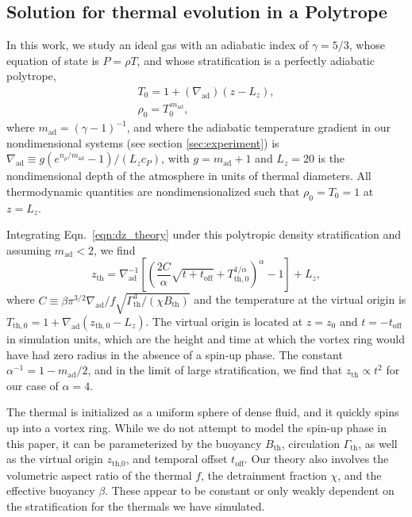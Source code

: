 \documentclass[twocolumn, amsmath, amsfonts, amssymb, trackchanges]{aastex62}
\newcommand{\grad}{\ensuremath{\nabla}}
\begin{document}
\subsection{Solution for thermal evolution in a Polytrope}
In this work, we study an ideal gas with an adiabatic index of $\gamma = 5/3$, whose equation of state is $P = \rho T$, and whose stratification is a perfectly adiabatic polytrope,
\begin{gather}
T_0 = 1 + (\grad_{\text{ad}})(z - L_z), \\
\rho_0 = T_0^{\,m_{\text{ad}}},
\label{eqn:polytrope}
\end{gather}
where $m_{\text{ad}} = (\gamma-1)^{-1}$, and where the adiabatic temperature gradient in our nondimensional systems (see section \ref{sec:experiment}) is $\grad_{\text{ad}} \equiv g(e^{n_\rho/m_{\text{ad}}} - 1)/(L_z c_P)$, with $g = m_{\text{ad}} + 1$ and $L_z = 20$ is the nondimensional depth of the atmosphere in units of thermal diameters.
All thermodynamic quantities are nondimensionalized such that $\rho_0 = T_0 = 1$ at $z = L_z$.
 
Integrating Eqn.~\ref{eqn:dz_theory} under this polytropic density stratification and assuming $m_{\text{ad}} < 2$, we find
\begin{equation}
z_{\text{th}} = \grad_{\text{ad}}^{-1}\left[\left(\frac{2C}{ \alpha } \sqrt{t + t_{\text{off}}} + T_{\text{th},0}^{1/\alpha}  \right)^{\alpha} - 1\right] + L_z,
\label{eqn:theory_z}
\end{equation}
where $C \equiv \beta \pi^{3/2} \grad_{\text{ad}} / f \sqrt{\Gamma_{\text{th}}^3/(\chi B_{\text{th}})}$ and the temperature at the virtual origin is $T_{\text{th},0} = 1 + \grad_{\text{ad}}(z_{\text{th},0} - L_z)$.
The virtual origin is located at $z = z_0$ and $t = -t_{\text{off}}$ in simulation units, which are the height and time at which the vortex ring would have had zero radius in the absence of a spin-up phase.
The constant $\alpha^{-1} = 1 - m_{\text{ad}}/2$, and in the limit of large stratification, we find that $z_{\text{th}} \propto t^2$ for our case of $\alpha = 4$. 

The thermal is initialized as a uniform sphere of dense fluid, and it quickly spins up into a vortex ring. 
While we do not attempt to model the spin-up phase in this paper, it can be parameterized by the buoyancy $B_{\text{th}}$, circulation $\Gamma_{\text{th}}$, as well as the virtual origin $z_{\text{th,0}}$, and temporal offset $t_{\text{off}}$. 
Our theory also involves the volumetric aspect ratio of the thermal $f$, the detrainment fraction $\chi$, and the effective buoyancy $\beta$. 
These appear to be constant or only weakly dependent on the stratification for the thermals we have simulated.
\end{document}
